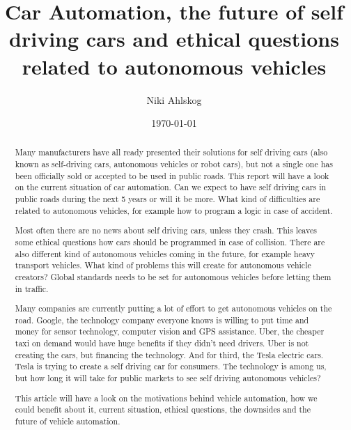 \documentclass[english]{tktltiki}
\begin{document}
\onehalfspacing

\title{Car Automation, the future of self driving cars and ethical questions 
related to autonomous vehicles}
\author{Niki Ahlskog}
\date{\today}

\maketitle




\begin{abstract}

Many manufacturers have all ready presented their solutions for self driving 
cars (also known as self-driving cars, autonomous vehicles or robot cars), but 
not a single one has been officially sold or accepted to be used in public 
roads. This report will have a look on the current situation of car automation. 
Can we expect to have self driving cars in public roads during the next 5 years 
or will it be more. What kind of difficulties are related to autonomous 
vehicles, for example how to program a logic in case of accident.


Most often there are no news about self driving cars, unless they crash. This 
leaves some ethical questions how cars should be programmed in case of 
collision. There are also different kind of autonomous vehicles coming in the 
future, for example heavy transport vehicles. What kind of problems this will 
create for autonomous vehicle creators? Global standards needs to be set for 
autonomous vehicles before letting them in traffic.

Many companies are currently putting a lot of effort to get autonomous vehicles 
on the road. Google, the technology company everyone knows is willing to put 
time and money for sensor technology, computer vision and GPS assistance. Uber, 
the cheaper taxi on demand would have huge benefits if they didn't need drivers. 
Uber is not creating the cars, but financing the technology. And for third, the 
Tesla electric cars. Tesla is trying to create a self driving car for consumers. 
The technology is among us, but how long it will take for public markets to see 
self driving autonomous vehicles?

This article will have a look on the motivations behind vehicle automation, how 
we could benefit about it, current situation, ethical questions, the downsides 
and the future of vehicle automation.


\end{abstract}
\end{document}
